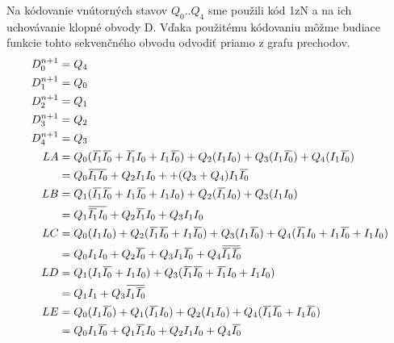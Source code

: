 \newpage
\noindent
Na kódovanie vnútorných stavov $Q_{0}..Q_{4}$ sme použili kód 1zN a na ich uchovávanie
klopné obvody D. Vďaka použitému kódovaniu môžme budiace funkcie tohto sekvenčného 
obvodu odvodiť priamo z grafu prechodov.
\begin{align*}
    D_{0}^{n+1} &= Q_{4}\\
    D_{1}^{n+1} &= Q_{0}\\
    D_{2}^{n+1} &= Q_{1}\\
    D_{3}^{n+1} &= Q_{2}\\
    D_{4}^{n+1} &= Q_{3}\\
    LA &= Q_0(\nt{I_1}\nt{I_0} + \nt{I_1}I_0 + I_1\nt{I_0}) + Q_2(I_1I_0) +
    Q_3(I_1\nt{I_0}) + Q_4(I_1\nt{I_0})\\
       &=Q_0\nt{I_1I_0} + Q_2I_1I_0 + + (Q_3 + Q_4)I_1\nt{I_0}\\
    LB &= Q_1(\nt{I_1}\nt{I_0} + I_1\nt{I_0} + I_1I_0) + Q_2(\nt{I_1}I_0) + Q_3(I_1I_0)\\
       &= Q_1\nt{\nt{I_1}I_0} + Q_2\nt{I_1}I_0 + Q_3I_1I_0\\
    LC &= Q_0(I_1I_0) + Q_2(\nt{I_1}\nt{I_0} + I_1\nt{I_0}) + Q_3(I_1\nt{I_0}) +
    Q_4(\nt{I_1}I_0 + I_1\nt{I_0} + I_1I_0)\\
       &= Q_0I_1I_0 + Q_2\nt{I_0} + Q_3I_1\nt{I_0} + Q_4\nt{\nt{I_1}\nt{I_0}}\\
    LD &= Q_1(I_1\nt{I_0} + I_1I_0) + Q_3(\nt{I_1}\nt{I_0} + \nt{I_1}I_0 + I_1I_0)\\
       &= Q_1I_1 + Q_3\nt{I_1\nt{I_0}}\\
    LE &= Q_0(I_1\nt{I_0}) + Q_1(\nt{I_1}I_0) + Q_2(I_1I_0) + Q_4(\nt{I_1}\nt{I_0} +
    I_1\nt{I_0})\\
       &= Q_0I_1\nt{I_0} + Q_1\nt{I_1}I_0 + Q_2I_1I_0 + Q_4\nt{I_0}
\end{align*}

